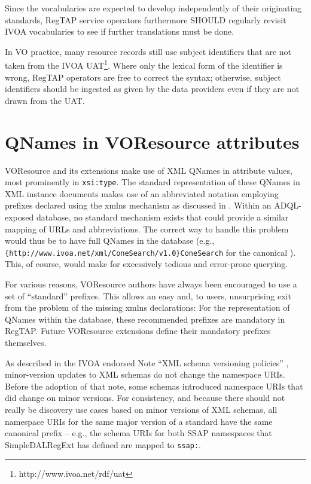 \documentclass[11pt,a4paper]{ivoa}
\begin{document}
Since the vocabularies are expected to develop independently of their
originating standards, RegTAP service operators furthermore SHOULD regularly
revisit IVOA vocabularies to see if further translations must be done.

In VO practice, many resource records still use subject identifiers that
are not taken from the IVOA UAT\footnote{{http://www.ivoa.net/rdf/uat}}.
Where only the lexical form of the identifier is wrong, RegTAP operators
are free to correct the syntax; otherwise, subject identifiers should be
ingested as given by the data providers even if they are not drawn from
the UAT.


\section{QNames in VOResource attributes}

\label{qnameatts}

VOResource and its extensions make use of XML QNames in attribute
values, most prominently in \texttt{xsi:type}.  The standard
representation of these QNames in XML instance documents makes use of an
abbreviated notation employing prefixes declared using the xmlns mechanism
as discussed in \citet{std:XMLNS}.  Within an ADQL-exposed database, no
standard mechanism exists that could provide a similar mapping of URLs
and abbreviations.  The correct way to handle this problem would thus be
to have full QNames in the database (e.g.,
\verb|{http://www.ivoa.net/xml/ConeSearch/v1.0}ConeSearch| for the
canonical ).  This, of course, would make for
excessively tedious and error-prone querying.

For various reasons, VOResource authors have always been encouraged
to use a set of ``standard'' prefixes.  This allows an easy and, to users,
unsurprising exit from the problem of the missing xmlns declarations:
For the representation of QNames within the database, these recommended
prefixes are mandatory in RegTAP. Future VOResource extensions define their
mandatory prefixes themselves.

As described in the IVOA endorsed Note ``XML schema versioning
policies'' \citep{2018ivoa.spec.0529H}, minor-version updates to XML
schemas do not change the namespace URIs.  Before the adoption of that
note, some schemas introduced namespace URIs that did change on minor
versions.  For consistency, and because there should not really be
discovery use cases based on minor versions of XML schemas, all
namespace URIs for the same major version of a standard have the same
canonical prefix -- e.g., the schema URIs for both SSAP namespaces that
SimpleDALRegExt has defined are mapped to \texttt{ssap:}.
\end{document}
